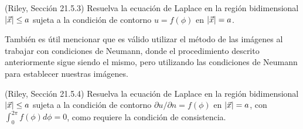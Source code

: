 \begin{ejemplo}
    (Riley, Sección 21.5.3) Resuelva la ecuación de Laplace en la región bidimensional $|\vec{x}| \leq a$ sujeta a la condición de contorno $u = f(\phi)$ en $|\vec{x}| = a$.
\end{ejemplo}

También es útil mencionar que es válido utilizar el método de las imágenes al trabajar con condiciones de Neumann, donde el procedimiento descrito anteriormente sigue siendo el mismo, pero utilizando las condiciones de Neumann para establecer nuestras imágenes.

\begin{ejemplo}
    (Riley, Sección 21.5.4) Resuelva la ecuación de Laplace en la región bidimensional $|\vec{x}| \leq a$ sujeta a la condición de contorno $\partial u/\partial n = f(\phi)$ en $|\vec{x}| = a$, con $\int_0^{2\pi} f(\phi) d\phi = 0$, como requiere la condición de consistencia.
\end{ejemplo}
